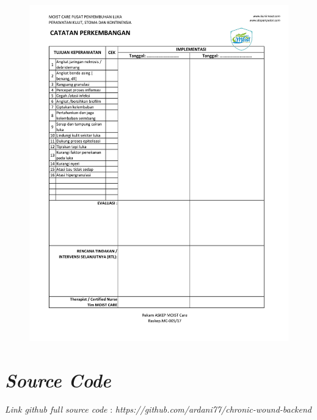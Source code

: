 \begin{figure}[H]
	\centering
	\includegraphics[keepaspectratio, width=14cm]{gambar/Format_Pengkajian-7}
	\label{gambar:Format_Pengkajian_7}
\end{figure}

\chapter{\emph{Source Code}}
\textit{Link github full source code} :
\textit{https://github.com/ardani77/chronic-wound-backend}